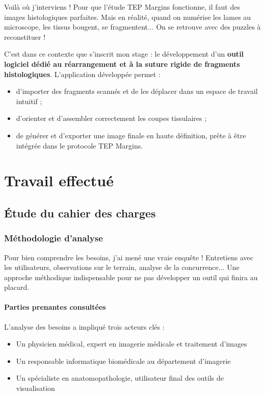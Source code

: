 \documentclass[11pt,a4paper]{report}
\begin{document}
Voilà où j'interviens ! Pour que l'étude TEP Margins fonctionne, il faut des images histologiques parfaites. Mais en réalité, quand on numérise les lames au microscope, les tissus bougent, se fragmentent... On se retrouve avec des puzzles à reconstituer !

C'est dans ce contexte que s'inscrit mon stage : le développement d'un \textbf{outil logiciel dédié au réarrangement et à la suture rigide de fragments histologiques}. L'application développée permet :

\begin{itemize}
\item d'importer des fragments scannés et de les déplacer dans un espace de travail intuitif ;
\item d'orienter et d'assembler correctement les coupes tissulaires ;
\item de générer et d'exporter une image finale en haute définition, prête à être intégrée dans le protocole TEP Margins.
\end{itemize}

\chapter{Travail effectué}

\section{Étude du cahier des charges}

\subsection{Méthodologie d'analyse}

Pour bien comprendre les besoins, j'ai mené une vraie enquête ! Entretiens avec les utilisateurs, observations sur le terrain, analyse de la concurrence... Une approche méthodique indispensable pour ne pas développer un outil qui finira au placard.

\subsubsection{Parties prenantes consultées}

L'analyse des besoins a impliqué trois acteurs clés :
\begin{itemize}
\item Un physicien médical, expert en imagerie médicale et traitement d'images
\item Un responsable informatique biomédicale au département d'imagerie
\item Un spécialiste en anatomopathologie, utilisateur final des outils de visualisation
\end{itemize}
\end{document}
